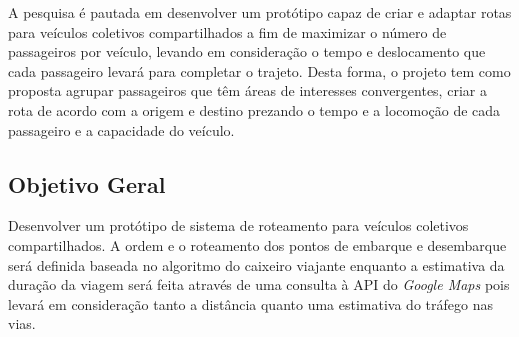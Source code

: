 A pesquisa é pautada em desenvolver um protótipo capaz de criar e adaptar rotas para veículos coletivos compartilhados a fim de maximizar o número de passageiros por veículo, levando em consideração o tempo e deslocamento que cada passageiro levará para completar o trajeto. Desta forma, o projeto tem como proposta agrupar passageiros que têm áreas de interesses convergentes, criar a rota de acordo com a origem e destino prezando o tempo e a locomoção de cada passageiro e a capacidade do veículo.

\subsection{Objetivo Geral}
Desenvolver um protótipo de sistema de roteamento para veículos coletivos compartilhados. A ordem e o roteamento dos pontos de embarque e desembarque será definida baseada no algoritmo do caixeiro viajante enquanto a estimativa da duração da viagem será feita através de uma consulta à API do \emph{Google Maps} pois levará em consideração tanto a distância quanto uma estimativa do tráfego nas vias.


